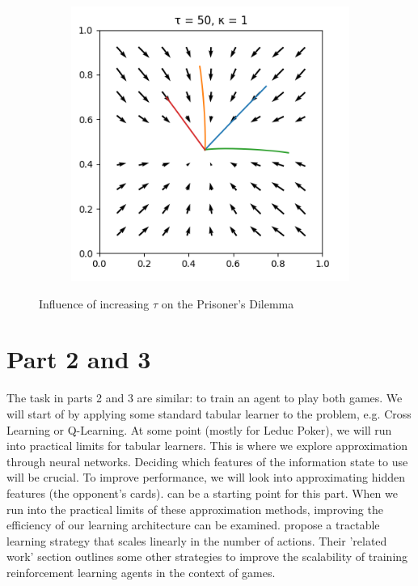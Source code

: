 \documentclass[10pt,a4paper]{article}
\begin{document}
\begin{figure}[h]
\begin{subfigure}[b]{0.30\textwidth}
    \end{subfigure}
    \begin{subfigure}[b]{0.30\textwidth}
        \includegraphics[width=\textwidth]{Figures/boltzmann_pd_temp50.png}
    \end{subfigure}
    \caption{Influence of increasing $\tau$ on the Prisoner's Dilemma}\label{fig:tau}
\end{figure}

\section{Part 2 and 3}
The task in parts 2 and 3 are similar: to train an agent to play both games. We will start of by applying some standard tabular learner to the problem, e.g. Cross Learning or Q-Learning. At some point (mostly for Leduc Poker), we will run into practical limits for tabular learners. This is where we explore approximation through neural networks. Deciding which features of the information state to use will be crucial. To improve performance, we will look into approximating hidden features (the opponent's cards). \citet{poker} can be a starting point for this part. When we run into the practical limits of these approximation methods, improving the efficiency of our learning architecture can be examined. \citet{dulacarnold2015deep} propose a tractable learning strategy that scales linearly in the number of actions. Their 'related work' section outlines some other strategies to improve the scalability of training reinforcement learning agents in the context of games. 




{}

\end{document}
